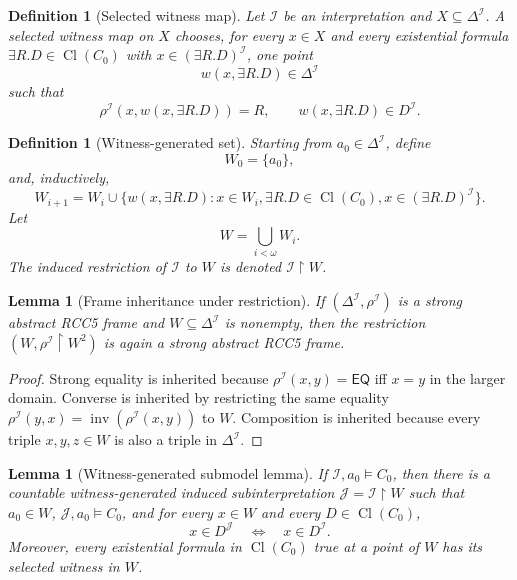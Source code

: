 \documentclass[11pt]{article}
\newtheorem{lemma}[theorem]{Lemma}
\newtheorem{definition}[theorem]{Definition}
\newcommand{\EQ}{\mathsf{EQ}}
\newcommand{\Inv}{\operatorname{inv}}
\newcommand{\Cl}{\operatorname{Cl}}
\newcommand{\I}{\mathcal I}
\newcommand{\J}{\mathcal J}
\begin{document}
\begin{definition}[Selected witness map]\label{def:witness-map}
Let $\I$ be an interpretation and $X\subseteq\Delta^\I$.  A selected witness map on $X$ chooses, for every $x\in X$ and every existential formula $\exists R.D\in\Cl(C_0)$ with $x\in(\exists R.D)^\I$, one point
\[
   w(x,\exists R.D)\in\Delta^\I
\]
such that
\[
   \rho^\I(x,w(x,\exists R.D))=R,
   \qquad
   w(x,\exists R.D)\in D^\I.
\]
\end{definition}

\begin{definition}[Witness-generated set]\label{def:witness-generated}
Starting from $a_0\in\Delta^\I$, define
\[
  W_0=\{a_0\},
\]
and, inductively,
\[
  W_{i+1}=W_i\cup\{w(x,\exists R.D):x\in W_i,
         \exists R.D\in\Cl(C_0),
         x\in(\exists R.D)^\I\}.
\]
Let
\[
  W=\bigcup_{i<\omega}W_i.
\]
The induced restriction of $\I$ to $W$ is denoted $\I\upharpoonright W$.
\end{definition}

\begin{lemma}[Frame inheritance under restriction]\label{lem:restriction-frame}
If $(\Delta^\I,\rho^\I)$ is a strong abstract RCC5 frame and $W\subseteq\Delta^\I$ is nonempty, then the restriction $(W,\rho^\I\upharpoonright W^2)$ is again a strong abstract RCC5 frame.
\end{lemma}

\begin{proof}
Strong equality is inherited because $\rho^\I(x,y)=\EQ$ iff $x=y$ in the larger domain.  Converse is inherited by restricting the same equality $\rho^\I(y,x)=\Inv(\rho^\I(x,y))$ to $W$.  Composition is inherited because every triple $x,y,z\in W$ is also a triple in $\Delta^\I$.
\end{proof}

\begin{lemma}[Witness-generated submodel lemma]\label{lem:thinning}
If $\I,a_0\models C_0$, then there is a countable witness-generated induced subinterpretation $\J=\I\upharpoonright W$ such that $a_0\in W$, $\J,a_0\models C_0$, and for every $x\in W$ and every $D\in\Cl(C_0)$,
\[
   x\in D^\J \quad\Longleftrightarrow\quad x\in D^\I.
\]
Moreover, every existential formula in $\Cl(C_0)$ true at a point of $W$ has its selected witness in $W$.
\end{lemma}
\end{document}
